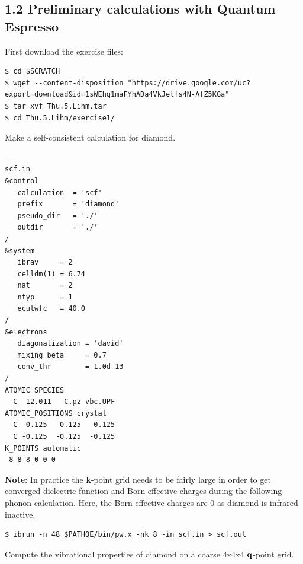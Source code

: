 \documentclass[a4paper,11pt,serif]{article}
\begin{document}
\vspace{0.5cm}


\subsection*{1.2 Preliminary calculations with Quantum Espresso}

First download the exercise files:
\begin{scriptsize}
\begin{verbatim}
$ cd $SCRATCH
$ wget --content-disposition "https://drive.google.com/uc?export=download&id=1sWEhq1maFYhADa4VkJetfs4N-AfZ5KGa"
$ tar xvf Thu.5.Lihm.tar
$ cd Thu.5.Lihm/exercise1/
\end{verbatim}
\end{scriptsize}


\action Make a self-consistent calculation for diamond.

\begin{scriptsize}
\begin{Verbatim}[frame=single]
--                                                                                                  scf.in
&control
   calculation  = 'scf'
   prefix       = 'diamond'
   pseudo_dir   = './'
   outdir       = './'
/
&system
   ibrav     = 2
   celldm(1) = 6.74
   nat       = 2
   ntyp      = 1
   ecutwfc   = 40.0
/
&electrons
   diagonalization = 'david'
   mixing_beta     = 0.7
   conv_thr        = 1.0d-13
/
ATOMIC_SPECIES
  C  12.011   C.pz-vbc.UPF
ATOMIC_POSITIONS crystal
  C  0.125   0.125   0.125
  C -0.125  -0.125  -0.125
K_POINTS automatic
 8 8 8 0 0 0
\end{Verbatim}
\end{scriptsize}
\begin{footnotesize}
   {\bf Note}: In practice the \textbf{k}-point grid needs to be fairly large in order to get converged dielectric function and Born effective charges during the following phonon calculation.
   Here, the Born effective charges are 0 as diamond is infrared inactive.
\end{footnotesize}

\begin{verbatim}
$ ibrun -n 48 $PATHQE/bin/pw.x -nk 8 -in scf.in > scf.out
\end{verbatim}

\vspace{0.5cm}
\action Compute the vibrational properties of diamond on a coarse 4x4x4 $\bf{q}$-point grid.
\end{document}
